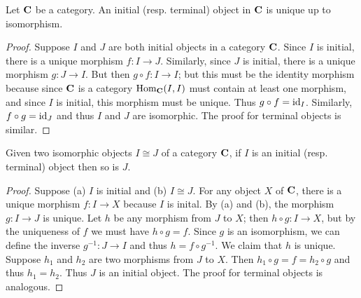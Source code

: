 \begin{theorem}
    \label{thm:initial-terminal-unique}
    Let \(\mathbf{C}\) be a category. An initial (resp. terminal) object in
    \(\mathbf{C}\) is unique up to isomorphism.
\end{theorem}

\begin{proof}
    Suppose \(I\) and \(J\) are both initial objects in a category \(\mathbf{C}\).
    Since \(I\) is initial, there is a unique morphism \(f: I \to J\).
    Similarly, since \(J\) is initial, there is a unique morphism \(g: J \to
    I\). But then \(g \circ f: I \to I\); but this must be the identity morphism
    because since \(\mathbf{C}\) is a category \(\operatorname{Hom}_{\mathbf{C}}(I, I)\) must
    contain at least one morphism, and since \(I\) is initial, this morphism
    must be unique. Thus \(g \circ f = \operatorname{id}_{I}\). Similarly, \(f \circ g =
    \operatorname{id}_{J}\) and thus \(I\) and \(J\) are isomorphic. The proof for terminal
    objects is similar.
\end{proof}

\begin{theorem}
    \label{thm:isomorphic-objects-initial-terminal}
    Given two isomorphic objects \(I \cong J\) of a category \(\mathbf{C}\), if
    \(I\) is an initial (resp. terminal) object then so is \(J\).
\end{theorem}

\begin{proof}
    Suppose (a) \(I\) is initial and (b) \(I \cong J\). For any object \(X\) of
    \(\mathbf{C}\), there is a unique morphism \(f: I \to X\) because \(I\) is
    inital. By (a) and (b), the morphism \(g: I \to J\) is unique. Let \(h\) be
    any morphism from \(J\) to \(X\); then \(h \circ g: I \to X\), but by the
    uniqueness of \(f\) we must have \(h \circ g = f\). Since \(g\) is an
    isomorphism, we can define the inverse \(g^{-1}: J \to I\) and thus \(h = f
    \circ g^{-1}\). We claim that \(h\) is unique. Suppose \(h_1\) and \(h_2\)
    are two morphisms from \(J\) to \(X\). Then \(h_1 \circ g = f = h_2 \circ
    g\) and thus \(h_1 = h_2\). Thus \(J\) is an initial object. The proof for
    terminal objects is analogous.
\end{proof}

